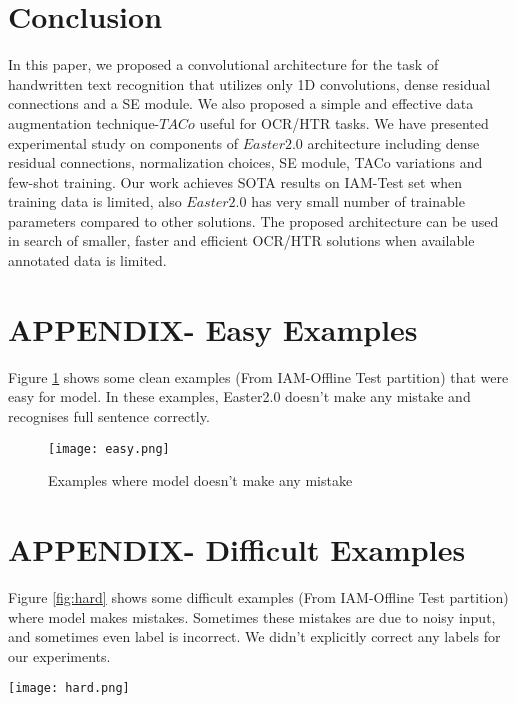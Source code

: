 \documentclass{article}
\begin{document}
\section{Conclusion}
In this paper, we proposed a convolutional architecture for the task of handwritten text recognition that utilizes only 1D convolutions, dense residual connections and a SE module. We also proposed a simple and effective data augmentation technique-$TACo$ useful for OCR/HTR tasks. We have presented experimental study on components of $Easter2.0$ architecture including dense residual connections, normalization choices, SE module, TACo variations and few-shot training. Our work achieves SOTA results on IAM-Test set when training data is limited, also $Easter2.0$ has very small number of trainable parameters compared to other solutions. The proposed architecture can be used in search of smaller, faster and efficient OCR/HTR solutions when available annotated data is limited.
\label{sec:headings_3}


  
  

\newpage
\appendix
\onecolumn

\section{APPENDIX- Easy Examples}
Figure \ref{fig:easy} shows some clean examples (From IAM-Offline Test partition) that were easy for model. In these examples, Easter2.0 doesn't make any mistake and recognises full sentence correctly.
\begin{figure}[h]
  \centering
  \texttt{[image: easy.png]}
  \caption{Examples where model doesn't make any mistake}
  \label{fig:easy}
\end{figure}

\newpage

\section{APPENDIX- Difficult Examples}
Figure \ref{fig:hard} shows some difficult examples (From IAM-Offline Test partition) where model makes mistakes. Sometimes these mistakes are due to noisy input, and sometimes even label is incorrect. We didn't explicitly correct any labels for our experiments. 

\begin{figure*}[t]
  \centering
  \texttt{[image: hard.png]}
  \caption{Examples where model makes mistakes}
  \label{fig:hard}
\end{figure*}
\end{document}
